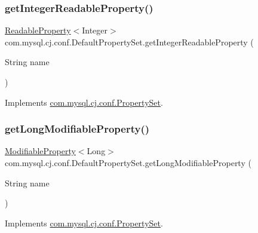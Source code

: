 \subsubsection{\texorpdfstring{get\+Integer\+Readable\+Property()}{getIntegerReadableProperty()}}
{\footnotesize\ttfamily \mbox{\hyperlink{interfacecom_1_1mysql_1_1cj_1_1conf_1_1_readable_property}{Readable\+Property}}$<$Integer$>$ com.\+mysql.\+cj.\+conf.\+Default\+Property\+Set.\+get\+Integer\+Readable\+Property (\begin{DoxyParamCaption}\item[{String}]{name }\end{DoxyParamCaption})}



Implements \mbox{\hyperlink{interfacecom_1_1mysql_1_1cj_1_1conf_1_1_property_set_a95fdeed14f959c79664ea5814608c17b}{com.\+mysql.\+cj.\+conf.\+Property\+Set}}.

\mbox{\label{classcom_1_1mysql_1_1cj_1_1conf_1_1_default_property_set_a5099422aad8cc1a99c4b0f037d661237}} 
\subsubsection{\texorpdfstring{get\+Long\+Modifiable\+Property()}{getLongModifiableProperty()}}
{\footnotesize\ttfamily \mbox{\hyperlink{interfacecom_1_1mysql_1_1cj_1_1conf_1_1_modifiable_property}{Modifiable\+Property}}$<$Long$>$ com.\+mysql.\+cj.\+conf.\+Default\+Property\+Set.\+get\+Long\+Modifiable\+Property (\begin{DoxyParamCaption}\item[{String}]{name }\end{DoxyParamCaption})}



Implements \mbox{\hyperlink{interfacecom_1_1mysql_1_1cj_1_1conf_1_1_property_set_a19570f2efd6239cdacbf6628113b574f}{com.\+mysql.\+cj.\+conf.\+Property\+Set}}.

\mbox{\label{classcom_1_1mysql_1_1cj_1_1conf_1_1_default_property_set_ae3159cdeb5ee6bc987ca800feecef60c}} 
